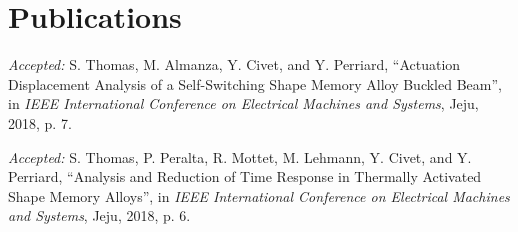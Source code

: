 \section{Publications}
{\small
\begin{enumerate}[label={[\Alph*]}]
  \item \emph{Accepted:} S. Thomas, M. Almanza, Y. Civet, and Y. Perriard, ``Actuation Displacement Analysis of a Self-Switching Shape Memory Alloy Buckled Beam'', in \emph{IEEE International Conference on Electrical Machines and Systems}, Jeju, 2018, p. 7. \label{bib:SelfSwitch}
  \item \emph{Accepted:} S. Thomas, P. Peralta, R. Mottet, M. Lehmann, Y. Civet, and Y. Perriard, ``Analysis and Reduction of Time Response in Thermally Activated Shape Memory Alloys'', in \emph{IEEE International Conference on Electrical Machines and Systems}, Jeju, 2018, p. 6. \label{bib:TimeResponse}
\end{enumerate}
}
